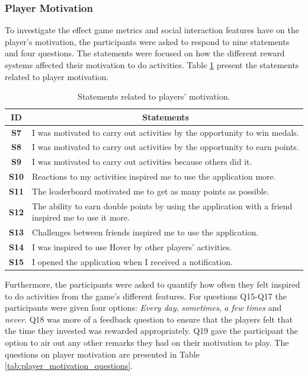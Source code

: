 \subsubsection{Player Motivation}
To investigate the effect game metrics and social interaction features have on the player’s motivation, the participants were asked to respond to nine statements and four questions. The statements were focused on how the different reward systems affected their motivation to do activities. Table \ref{tab:player_motivation_statements} present the statements related to player motivation.

\begin{table}[H]
    \centering
    \begin{tabularx}{0.95\textwidth}{|c|X|}
        \hline
        \textbf{ID} & \multicolumn{1}{c|}{\textbf{Statements}} \\ \hline
        \textbf{S7} & I was motivated to carry out activities by the opportunity to win medals. \\
        \textbf{S8} & I was motivated to carry out activities by the opportunity to earn points. \\
        \textbf{S9} & I was motivated to carry out activities because others did it. \\
        \textbf{S10} & Reactions to my activities inspired me to use the application more. \\
        \textbf{S11} & The leaderboard motivated me to get as many points as possible. \\
        \textbf{S12} & The ability to earn double points by using the application with a friend inspired me to use it more. \\
        \textbf{S13} & Challenges between friends inspired me to use the application. \\
        \textbf{S14} & I was inspired to use Hover by other players' activities. \\
        \textbf{S15} & I opened the application when I received a notification. \\ \hline
    \end{tabularx}
    \caption{Statements related to players' motivation.}
    \label{tab:player_motivation_statements}
\end{table}

Furthermore, the participants were asked to quantify how often they felt inspired to do activities from the game’s different features. For questions Q15-Q17 the participants were given four options: \textit{Every day}, \textit{sometimes}, \textit{a few times} and \textit{never}. Q18 was more of a feedback question to ensure that the players felt that the time they invested was rewarded appropriately. Q19 gave the participant the option to air out any other remarks they had on their motivation to play. The questions on player motivation are presented in Table \ref{tab:player_motivation_questions}.

